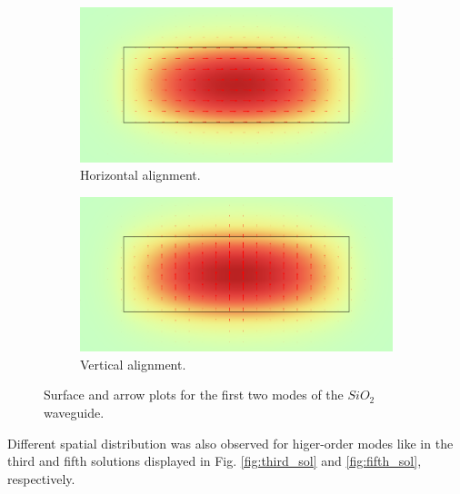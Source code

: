 \documentclass[a4paper,12pt]{article}
\begin{document}
\begin{figure}[H]
    \centering
    \begin{subfigure}{0.45\textwidth}
        \centering
        \includegraphics[scale=0.32]{SiO2_normE_1.png}
        \caption{Horizontal alignment.}
        \label{fig:E_hor}
    \end{subfigure}
    \hfill
    \begin{subfigure}{0.45\textwidth}
        \centering
        \includegraphics[scale=0.32]{SiO2_normE_2.png}
        \caption{Vertical alignment.}
        \label{fig:E_ver}
    \end{subfigure}
    \caption{Surface and arrow plots for the first two modes of the $SiO_2$ waveguide.}
\end{figure}

Different spatial distribution was also observed for higer-order modes like in the third and fifth solutions displayed in Fig. \ref{fig:third_sol} and \ref{fig:fifth_sol}, respectively.
\end{document}
